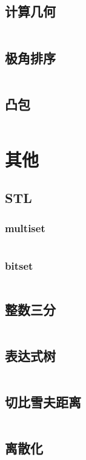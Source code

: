 \documentclass[a4paper,11pt]{article}
\begin{document}
\subsection{计算几何} 
\inputminted[breaklines]{c++}{计算几何/计算几何.cpp}

\subsection{极角排序} 
\inputminted[breaklines]{c++}{计算几何/极角排序.cpp}

\subsection{凸包} 
\inputminted[breaklines]{c++}{计算几何/凸包.cpp} 

\section{其他} 
\subsection{STL}
\subsubsection{multiset}
\inputminted[breaklines]{c++}{其他/multiset.cpp}

\subsubsection{bitset}
\inputminted[breaklines]{c++}{其他/bitset.cpp}

\subsection{整数三分} 
\inputminted[breaklines]{c++}{其他/整数三分.cpp} 

\subsection{表达式树} 
\inputminted[breaklines]{c++}{其他/表达式树.cpp} 

\subsection{切比雪夫距离} 
\inputminted[breaklines]{c++}{其他/切比雪夫距离.cpp} 

\subsection{离散化} 
\inputminted[breaklines]{c++}{其他/离散化.cpp}
\end{document}
